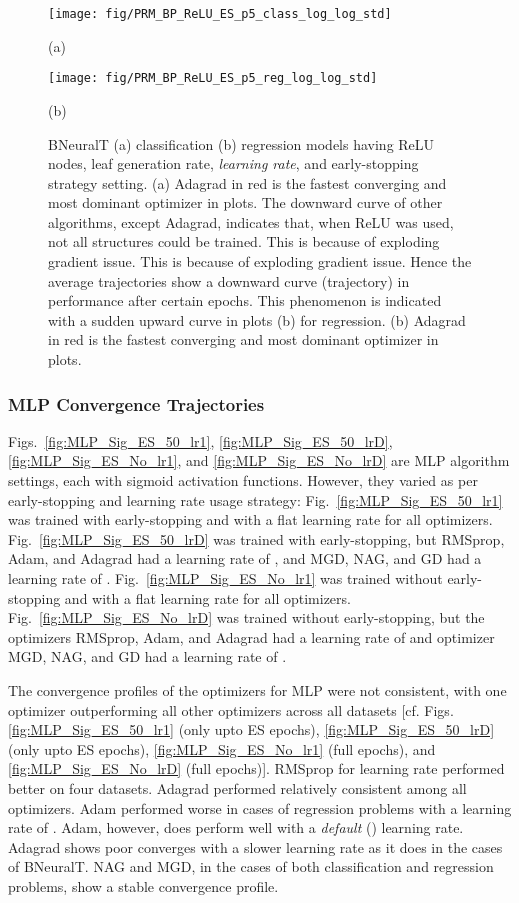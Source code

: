 \documentclass[11pt,a4paper]{article}
\begin{document}
\begin{figure}
        \centering
        \texttt{[image: fig/PRM\_BP\_ReLU\_ES\_p5\_class\_log\_log\_std]}


        (a)
        
        \centering
        \texttt{[image: fig/PRM\_BP\_ReLU\_ES\_p5\_reg\_log\_log\_std]}
        
        (b)
        \caption{BNeuralT (a) classification (b) regression models having ReLU nodes,  leaf generation rate,  \textit{learning rate}, and early-stopping strategy setting.
        (a) Adagrad in red is the fastest converging and most dominant  optimizer in plots. The downward curve of other algorithms, except Adagrad, indicates that, when ReLU was used, not all structures could be trained. This is because of exploding gradient issue. This is because of exploding gradient issue. Hence the average trajectories show a downward curve (trajectory) in performance after certain epochs. This phenomenon is indicated with a sudden upward curve in plots (b) for regression. (b) Adagrad in red is the fastest converging and most dominant optimizer in plots.
\label{fig:PRM_BP_ReLU_ES_p5}}
    \end{figure}
    
    \clearpage
\subsubsection{MLP Convergence Trajectories}
    Figs.~\ref{fig:MLP_Sig_ES_50_lr1},
    \ref{fig:MLP_Sig_ES_50_lrD}, 
    \ref{fig:MLP_Sig_ES_No_lr1}, and 
    \ref{fig:MLP_Sig_ES_No_lrD}
    are MLP algorithm settings, each with sigmoid activation functions. However, they  varied as per early-stopping and learning rate usage strategy:
Fig.~\ref{fig:MLP_Sig_ES_50_lr1} was trained with early-stopping and with a flat  learning rate for all optimizers. 
Fig.~\ref{fig:MLP_Sig_ES_50_lrD} was trained with early-stopping, but  RMSprop, Adam, and Adagrad had a learning rate of , and MGD, NAG, and GD  had a learning rate of .
Fig.~\ref{fig:MLP_Sig_ES_No_lr1} was trained without early-stopping and with a flat  learning rate for all optimizers. 
Fig.~\ref{fig:MLP_Sig_ES_No_lrD} was trained without early-stopping, but the optimizers RMSprop, Adam, and Adagrad had a learning rate of  and optimizer MGD, NAG, and GD  had a learning rate of .
    
    The convergence profiles of the optimizers for MLP were not consistent, with one optimizer outperforming all other optimizers across  all datasets [cf. Figs. \ref{fig:MLP_Sig_ES_50_lr1} (only upto ES epochs),
    \ref{fig:MLP_Sig_ES_50_lrD} (only upto ES epochs), 
    \ref{fig:MLP_Sig_ES_No_lr1} (full epochs), and 
    \ref{fig:MLP_Sig_ES_No_lrD} (full epochs)].  
RMSprop for learning rate  performed better on four datasets. Adagrad performed relatively consistent among all optimizers. Adam performed worse in cases of regression problems with a learning rate of . Adam, however, does perform well with a \textit{default} () learning rate. Adagrad shows poor converges with a slower learning rate as it does in the cases of BNeuralT. NAG and MGD, in the cases of both classification and regression problems, show a stable convergence profile.
    
\end{document}
